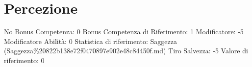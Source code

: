 \section{Percezione}\label{percezione}

\begin{description}
\tightlist
\item[Tags: ABI]
No Bonus Competenza: 0 Bonus Competenza di Riferimento: 1 Modificatore:
-5 Modificatore Abilità: 0 Statistica di riferimento: Saggezza
(Saggezza\%20822b138e72f0470897e902e48c84450f.md) Tiro Salvezza: -5
Valore di riferimento: 0
\end{description}
